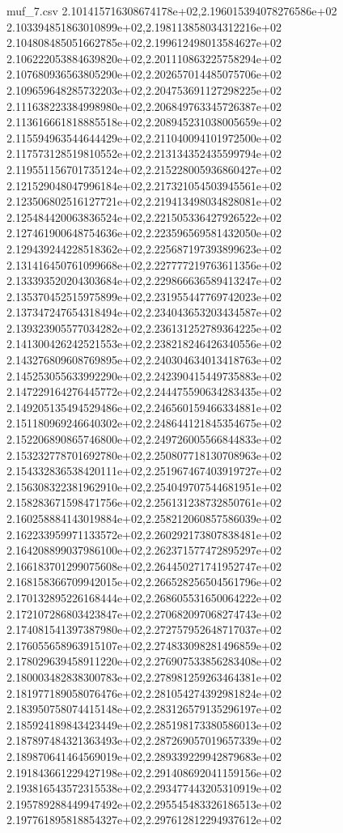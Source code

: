 \begin{filecontents*}{muf_7.csv}
2.101415716308674178e+02,2.196015394078276586e+02
2.103394851863010899e+02,2.198113858034312216e+02
2.104808485051662785e+02,2.199612498013584627e+02
2.106222053884639820e+02,2.201110863225758294e+02
2.107680936563805290e+02,2.202657014485075706e+02
2.109659648285732203e+02,2.204753691127298225e+02
2.111638223384998980e+02,2.206849763345726387e+02
2.113616661818885518e+02,2.208945231038005659e+02
2.115594963544644429e+02,2.211040094101972500e+02
2.117573128519810552e+02,2.213134352435599794e+02
2.119551156701735124e+02,2.215228005936860427e+02
2.121529048047996184e+02,2.217321054503945561e+02
2.123506802516127721e+02,2.219413498034828081e+02
2.125484420063836524e+02,2.221505336427926522e+02
2.127461900648754636e+02,2.223596569581432050e+02
2.129439244228518362e+02,2.225687197393899623e+02
2.131416450761099668e+02,2.227777219763611356e+02
2.133393520204303684e+02,2.229866636589413247e+02
2.135370452515975899e+02,2.231955447769742023e+02
2.137347247654318494e+02,2.234043653203434587e+02
2.139323905577034282e+02,2.236131252789364225e+02
2.141300426242521553e+02,2.238218246426340556e+02
2.143276809608769895e+02,2.240304634013418763e+02
2.145253055633992290e+02,2.242390415449735883e+02
2.147229164276445772e+02,2.244475590634283435e+02
2.149205135494529486e+02,2.246560159466334881e+02
2.151180969246640302e+02,2.248644121845354675e+02
2.152206890865746800e+02,2.249726005566844833e+02
2.153232778701692780e+02,2.250807718130708963e+02
2.154332836538420111e+02,2.251967467403919727e+02
2.156308322381962910e+02,2.254049707544681951e+02
2.158283671598471756e+02,2.256131238732850761e+02
2.160258884143019884e+02,2.258212060857586039e+02
2.162233959971133572e+02,2.260292173807838481e+02
2.164208899037986100e+02,2.262371577472895297e+02
2.166183701299075608e+02,2.264450271741952747e+02
2.168158366709942015e+02,2.266528256504561796e+02
2.170132895226168444e+02,2.268605531650064222e+02
2.172107286803423847e+02,2.270682097068274743e+02
2.174081541397387980e+02,2.272757952648717037e+02
2.176055658963915107e+02,2.274833098281496859e+02
2.178029639458911220e+02,2.276907533856283408e+02
2.180003482838300783e+02,2.278981259263464381e+02
2.181977189058076476e+02,2.281054274392981824e+02
2.183950758074415148e+02,2.283126579135296197e+02
2.185924189843423449e+02,2.285198173380586013e+02
2.187897484321363493e+02,2.287269057019657339e+02
2.189870641464569019e+02,2.289339229942879683e+02
2.191843661229427198e+02,2.291408692041159156e+02
2.193816543572315538e+02,2.293477443205310919e+02
2.195789288449947492e+02,2.295545483326186513e+02
2.197761895818854327e+02,2.297612812294937612e+02

\end{filecontents*}
